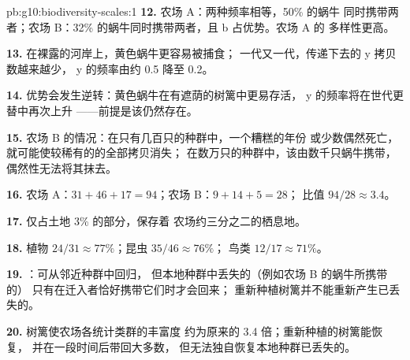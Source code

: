 \begin{solution}{pb:g10:biodiversity-scales:1}
\textbf{12.} 农场 A：两种频率相等，50\% 的蜗牛
同时携带两者；农场 B：32\% 的蜗牛同时携带两者，且 b 占优势。农场 A 的
多样性更高。

\textbf{13.} 在裸露的河岸上，黄色蜗牛更容易被捕食；
一代又一代，传递下去的 y 拷贝数越来越少，
y 的频率由约 0.5 降至 0.2。

\textbf{14.} 优势会发生逆转：黄色蜗牛在有遮荫的树篱中更易存活，
y 的频率将在世代更替中再次上升
——前提是该仍然存在。

\textbf{15.} 农场 B 的情况：在只有几百只的种群中，一个糟糕的年份
或少数偶然死亡，就可能使较稀有的的全部拷贝消失；
在数万只的种群中，该由数千只蜗牛携带，
偶然性无法将其抹去。

\textbf{16.} 农场 A：$31 + 46 + 17 = 94$；农场 B：$9 + 14 + 5 = 28$；
比值 $94/28 \approx 3.4$。

\textbf{17.} 仅占土地 3\% 的部分，保存着
农场约三分之二的栖息地。

\textbf{18.} 植物 $24/31 \approx 77\%$；昆虫 $35/46 \approx 76\%$；
鸟类 $12/17 \approx 71\%$。

\textbf{19.} ：可从邻近种群中回归，
但本地种群中丢失的（例如农场 B 的蜗牛所携带的）
只有在迁入者恰好携带它们时才会回来；
重新种植树篱并不能重新产生已丢失的。

\textbf{20.} 树篱使农场各统计类群的丰富度
约为原来的 3.4 倍；重新种植的树篱能恢复，
并在一段时间后带回大多数，
但无法独自恢复本地种群已丢失的。
\end{solution}
